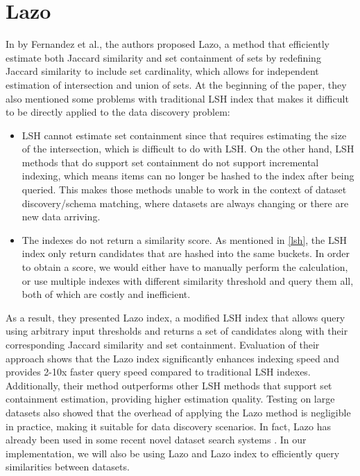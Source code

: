 \section{Lazo}\label{lazo}

In \cite{lazo} by Fernandez et al., the authors proposed Lazo, a method that efficiently estimate both Jaccard similarity and set containment of sets by redefining Jaccard similarity to include set cardinality, which allows for independent estimation of intersection and union of sets. At the beginning of the paper, they also mentioned some problems with traditional LSH index that makes it difficult to be directly applied to the data discovery problem:

\begin{itemize}
    \item LSH cannot estimate set containment since that requires estimating the size of the intersection, which is difficult to do with LSH. On the other hand, LSH methods that do support set containment do not support incremental indexing, which means items can no longer be hashed to the index after being queried. This makes those methods unable to work in the context of dataset discovery/schema matching, where datasets are always changing or there are new data arriving.
    \item The indexes do not return a similarity score. As mentioned in \ref{lsh}, the LSH index only return candidates that are hashed into the same buckets. In order to obtain a score, we would either have to manually perform the calculation, or use multiple indexes with different similarity threshold and query them all, both of which are costly and inefficient.
\end{itemize}

As a result, they presented Lazo index, a modified LSH index that allows query using arbitrary input thresholds and returns a set of candidates along with their corresponding Jaccard similarity and set containment. Evaluation of their approach shows that the Lazo index significantly enhances indexing speed and provides 2-10x faster query speed compared to traditional LSH indexes. Additionally, their method outperforms other LSH methods that support set containment estimation, providing higher estimation quality. Testing on large datasets also showed that the overhead of applying the Lazo method is negligible in practice, making it suitable for data discovery scenarios. In fact, Lazo has already been used in some recent novel dataset search systems \cite{aurum, auctus}. In our implementation, we will also be using Lazo and Lazo index to efficiently query similarities between datasets.


